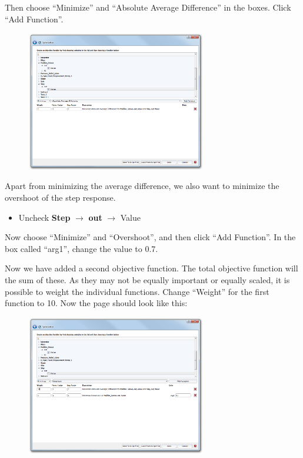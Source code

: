 \documentclass[a4paper,pdftex]{article}
\begin{document}
\begin{tutenumerate}
Then choose \enquote{Minimize} and \enquote{Absolute Average Difference} in the boxes. Click \enquote{Add Function}.

\FloatBarrier
\begin{figure}[htb]
\center
\includegraphics[width=0.7\textwidth]{gfx/optimization/screenshot-opt3a.png}
\end{figure}
\FloatBarrier

Apart from minimizing the average difference, we also want to minimize the overshoot of the step response. 
\begin{itemize}
\item Uncheck \textbf{Step} $\rightarrow$ \textbf{out} $\rightarrow$ Value
\end{itemize}

Now choose \enquote{Minimize} and \enquote{Overshoot}, and then click \enquote{Add Function}. In the box called \enquote{arg1}, change the value to 0.7. 

Now we have added a second objective function. The total objective function will the sum of these. As they may not be equally important or equally scaled, it is possible to weight the individual functions.  Change \enquote{Weight} for the first function to 10. Now the page should look like this:

\FloatBarrier
\begin{figure}[htb]
\center
\includegraphics[width=0.7\textwidth]{gfx/optimization/screenshot-opt3b.png}
\end{figure}
\FloatBarrier


\end{tutenumerate}
\end{document}
